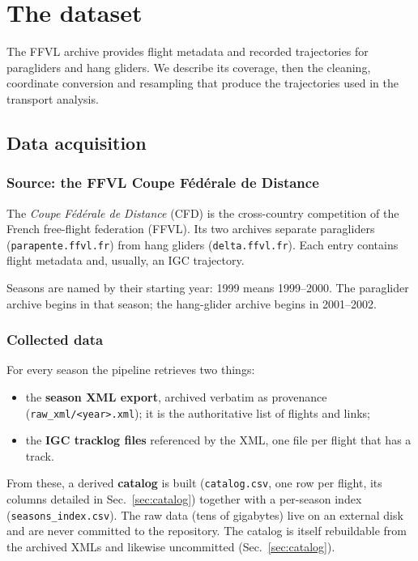 \chapter{The dataset}
\label{ch:dataset}

The FFVL archive provides flight metadata and recorded trajectories for paragliders
and hang gliders. We describe its coverage, then the cleaning, coordinate conversion
and resampling that produce the trajectories used in the transport analysis.

\section{Data acquisition}
\label{sec:acquisition}

\subsection{Source: the FFVL Coupe F\'ed\'erale de Distance}

The \emph{Coupe F\'ed\'erale de Distance} (CFD) is the cross-country competition
of the French free-flight federation (FFVL). Its two archives separate paragliders
(\texttt{parapente.ffvl.fr}) from hang gliders (\texttt{delta.ffvl.fr}). Each entry
contains flight metadata and, usually, an IGC trajectory.

Seasons are named by their starting year: 1999 means 1999--2000. The paraglider
archive begins in that season; the hang-glider archive begins in 2001--2002.

\subsection{Collected data}

For every season the pipeline retrieves two things:
\begin{itemize}
  \item the \textbf{season XML export}, archived verbatim as provenance
        (\texttt{raw\_xml/<year>.xml}); it is the authoritative list of flights and links;
  \item the \textbf{IGC tracklog files} referenced by the XML, one file per flight that
        has a track.
\end{itemize}
From these, a derived \textbf{catalog} is built (\texttt{catalog.csv}, one row per flight,
its columns detailed in Sec.~\ref{sec:catalog}) together with a per-season index
(\texttt{seasons\_index.csv}). The raw data (tens of gigabytes) live on an external disk
and are never committed to the repository. The catalog is itself rebuildable from
the archived XMLs and likewise uncommitted (Sec.~\ref{sec:catalog}).

